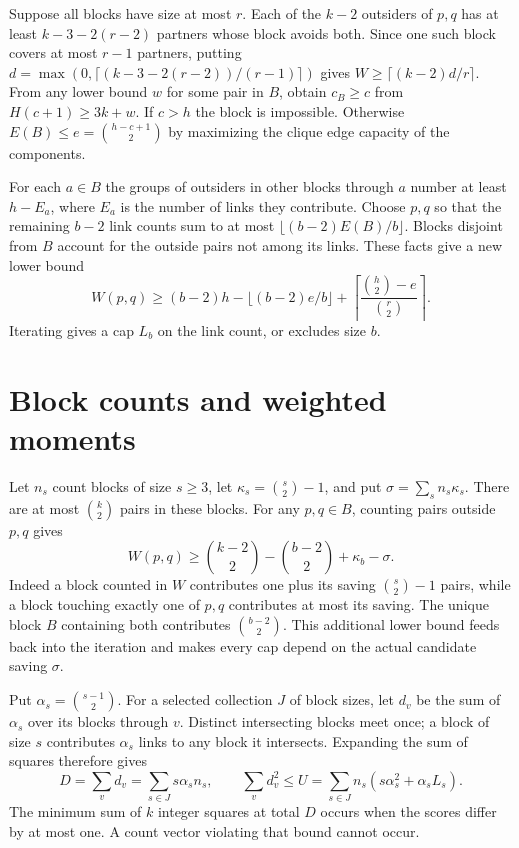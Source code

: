 \documentclass[11pt,letterpaper]{article}
\begin{document}
Suppose all blocks have size at most $r$. Each of the $k-2$ outsiders
of $p,q$ has at least $k-3-2(r-2)$ partners whose block avoids both.
Since one such block covers at most $r-1$ partners, putting
$d=\max(0,\lceil(k-3-2(r-2))/(r-1)\rceil)$ gives
$W\ge\lceil(k-2)d/r\rceil$. From any lower bound $w$ for some pair
in $B$, obtain $c_B\ge c$ from $H(c+1)\ge3k+w$. If $c>h$ the
block is impossible. Otherwise $E(B)\le e=\binom{h-c+1}{2}$ by
maximizing the clique edge capacity of the components.

\newpage
For each $a\in B$ the groups of outsiders in other blocks through
$a$ number at least $h-E_a$, where $E_a$ is the number of links
they contribute. Choose $p,q$ so that the remaining $b-2$ link
counts sum to at most $\lfloor(b-2)E(B)/b\rfloor$. Blocks
disjoint from $B$ account for the outside pairs not among its
links. These facts give a new lower bound
\[
W(p,q)\ge (b-2)h-\lfloor (b-2)e/b\rfloor
  +\left\lceil\frac{\binom h2-e}{\binom r2}\right\rceil .
\]
Iterating gives a cap $L_b$ on the link count, or excludes size $b$.

\section{Block counts and weighted moments}

Let $n_s$ count blocks of size $s\ge3$, let
$\kappa_s=\binom{s}{2}-1$, and put $\sigma=\sum_s n_s\kappa_s$.
There are at most $\binom{k}{2}$ pairs in these blocks.
For any $p,q\in B$, counting pairs outside $p,q$ gives
\[
W(p,q)\ge \binom{k-2}{2}-\binom{b-2}{2}+\kappa_b-\sigma .
\]
Indeed a block counted in $W$ contributes one plus its saving
$\binom{s}{2}-1$ pairs, while a block touching exactly one of $p,q$
contributes at most its saving. The unique block $B$ containing both
contributes $\binom{b-2}{2}$. This additional lower bound feeds back
into the iteration and makes every cap depend on the actual candidate
saving $\sigma$.

Put $\alpha_s=\binom{s-1}{2}$. For a selected collection $J$ of
block sizes, let $d_v$ be the sum of $\alpha_s$ over its blocks
through $v$. Distinct intersecting blocks meet once; a block of size
$s$ contributes $\alpha_s$ links to any block it intersects.
Expanding the sum of squares therefore gives
\[
D=\sum_v d_v=\sum_{s\in J}s\alpha_s n_s,\qquad
\sum_v d_v^2\le U=\sum_{s\in J}n_s(s\alpha_s^2+\alpha_s L_s).
\]
The minimum sum of $k$ integer squares at total $D$ occurs when the
scores differ by at most one. A count vector violating that bound
cannot occur.
\end{document}
